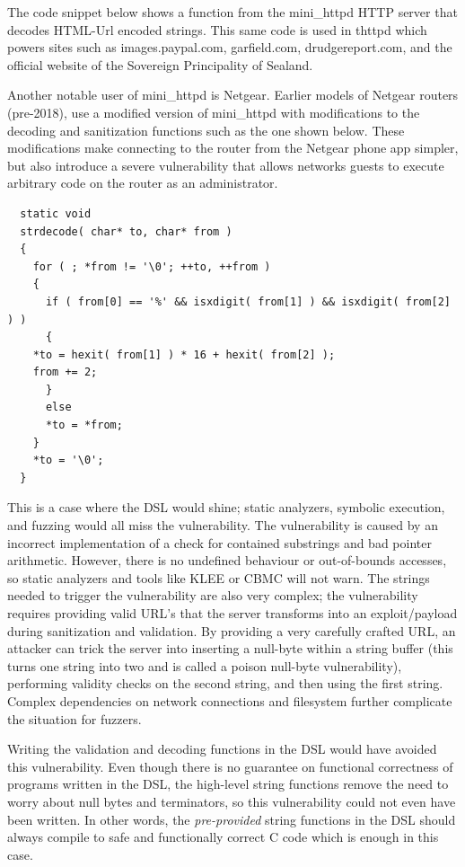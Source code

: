 \documentclass[letterpaper]{article}
\begin{document}
The code snippet below shows a function from the mini\_httpd
HTTP server that decodes HTML-Url encoded strings. This
same code is used in thttpd which powers sites such as
images.paypal.com, garfield.com, drudgereport.com, and
the official website of the Sovereign Principality of Sealand.

Another notable user of mini\_httpd is Netgear. Earlier
models of Netgear routers (pre-2018), use a modified version of mini\_httpd
with modifications to the decoding and sanitization functions such as
the one shown below. These modifications make connecting to the router
from the Netgear phone app simpler, but also introduce a severe vulnerability
that allows networks guests to execute arbitrary code on the router
as an administrator.


  \begin{lstlisting}
  static void
  strdecode( char* to, char* from )
  {
    for ( ; *from != '\0'; ++to, ++from )
    {
      if ( from[0] == '%' && isxdigit( from[1] ) && isxdigit( from[2] ) )
      {
	*to = hexit( from[1] ) * 16 + hexit( from[2] );
	from += 2;
      }
      else
      *to = *from;
    }
    *to = '\0';
  }
  \end{lstlisting}

This is a case where the DSL would shine; static analyzers, symbolic
execution, and fuzzing would all miss the vulnerability. The vulnerability
is caused by an incorrect implementation of a check for contained substrings
and bad pointer arithmetic. However, there is no undefined behaviour or
out-of-bounds accesses, so static analyzers and tools like KLEE or CBMC
will not warn. The strings needed to trigger the vulnerability are also
very complex; the vulnerability requires providing valid URL's that the
server transforms into an exploit/payload during sanitization and validation.
By providing a very carefully crafted URL, an attacker can trick the server
into inserting a null-byte within a string buffer (this turns one string into
two and is called a poison null-byte vulnerability), performing validity checks on the
second string, and then using the first string. Complex dependencies on
network connections and filesystem further complicate the situation for fuzzers.

Writing the validation and decoding functions in the DSL would have avoided
this vulnerability. Even though there is no guarantee on functional correctness
of programs written in the DSL, the high-level string functions remove the
need to worry about null bytes and terminators, so this vulnerability could not
even have been written. In other words, the \textit{pre-provided} string functions in the DSL
should always compile to safe and functionally correct C code which is enough
in this case.
\end{document}
